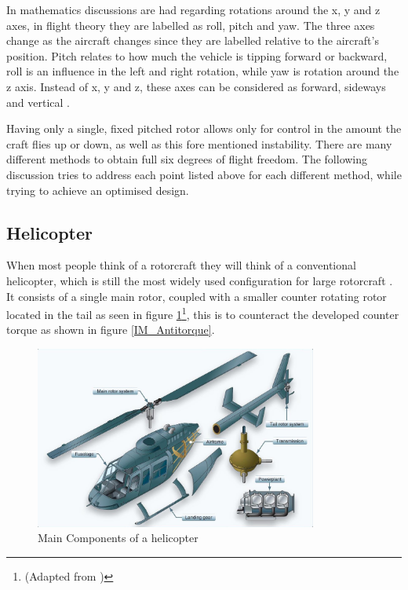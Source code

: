 In mathematics discussions are had regarding rotations around the x, y and z axes, in flight theory they are labelled as roll, pitch and yaw. The three axes change as the aircraft changes since they are labelled relative to the aircraft's position. Pitch relates to how much the vehicle is tipping forward or backward, roll is an influence in the left and right rotation, while yaw is rotation around the z axis. Instead of  x, y and z, these axes can be considered as forward, sideways and vertical \cite{Leishman}.

Having only a single, fixed pitched rotor allows only for control in the amount the craft flies up or down, as well as this fore mentioned instability. There are many different methods to obtain full six degrees of flight freedom. The following discussion tries to address each point listed above for each different method, while trying to achieve an optimised design.


\subsection{Helicopter}
When most people think of a rotorcraft they will think of a conventional helicopter, which is still the most widely used configuration for large rotorcraft \cite{RotorConfig}. It consists of a single main rotor, coupled with a smaller counter rotating rotor located in the tail as seen in figure \ref{IM_Helicopter}\footnote{(Adapted from \cite{Heli})}, this is to counteract the developed counter torque as shown in figure \ref{IM_Antitorque}.

\begin{figure}[H]
\centering
\includegraphics[height = 6cm]{Images/Literature/MainHeliComponents}     
\caption{Main Components of a helicopter \cite{Heli}}
\label{IM_Helicopter}
\end{figure}


